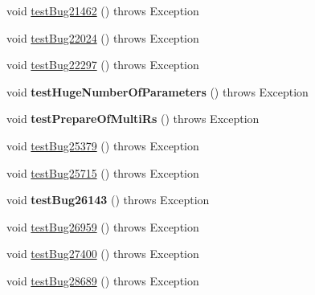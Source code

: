 \begin{DoxyCompactItemize}
\item 
void \mbox{\hyperlink{classtestsuite_1_1regression_1_1_callable_statement_regression_test_abb265c7a921933c8ecde8c1c12441513}{test\+Bug21462}} ()  throws Exception 
\item 
void \mbox{\hyperlink{classtestsuite_1_1regression_1_1_callable_statement_regression_test_a32068ab38e449a082792fc6fcd779fb3}{test\+Bug22024}} ()  throws Exception 
\item 
void \mbox{\hyperlink{classtestsuite_1_1regression_1_1_callable_statement_regression_test_a601d825ec8a6e6d2a5e2d3141e9355b4}{test\+Bug22297}} ()  throws Exception 
\item 
\mbox{\label{classtestsuite_1_1regression_1_1_callable_statement_regression_test_af2d71c7927c0532faaec78a0d07f1646}} 
void {\bfseries test\+Huge\+Number\+Of\+Parameters} ()  throws Exception 
\item 
\mbox{\label{classtestsuite_1_1regression_1_1_callable_statement_regression_test_aae08f07ea8a89cbb94d2b62326904991}} 
void {\bfseries test\+Prepare\+Of\+Multi\+Rs} ()  throws Exception 
\item 
void \mbox{\hyperlink{classtestsuite_1_1regression_1_1_callable_statement_regression_test_a8603b59f7d522506f151fce4db9e7fe7}{test\+Bug25379}} ()  throws Exception 
\item 
void \mbox{\hyperlink{classtestsuite_1_1regression_1_1_callable_statement_regression_test_af26c483761c1cc584287d8a35c4f82db}{test\+Bug25715}} ()  throws Exception 
\item 
\mbox{\label{classtestsuite_1_1regression_1_1_callable_statement_regression_test_acef13cfb17782dc6d9bc0aa4a289214f}} 
void {\bfseries test\+Bug26143} ()  throws Exception 
\item 
void \mbox{\hyperlink{classtestsuite_1_1regression_1_1_callable_statement_regression_test_a5184b94848dc877dcda10b8a55c6979f}{test\+Bug26959}} ()  throws Exception 
\item 
void \mbox{\hyperlink{classtestsuite_1_1regression_1_1_callable_statement_regression_test_a7980f197d22b9ff9cb6bcd2efe5848a6}{test\+Bug27400}} ()  throws Exception 
\item 
void \mbox{\hyperlink{classtestsuite_1_1regression_1_1_callable_statement_regression_test_ad52f0f9cf573c237f9b51732bcb429e8}{test\+Bug28689}} ()  throws Exception 

\end{DoxyCompactItemize}
